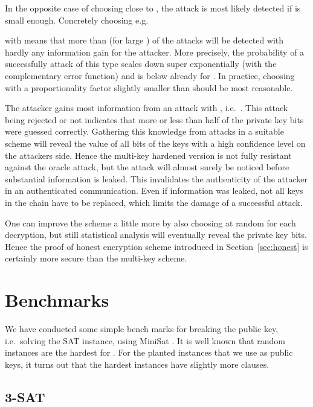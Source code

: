 \documentclass[final,journal,compsoc]{IEEEtran}
\begin{document}
In the opposite case of choosing
 close to , the attack is most likely detected if  is
small enough. Concretely choosing e.g.

with  means that more than  (for large ) of the attacks will be
detected with hardly any information gain for the attacker. More
precisely, the probability of a successfully attack of this type
scales down super exponentially (with the complementary error
function) and is below  already for . In practice,
choosing  with a proportionality factor slightly
smaller than  should be most reasonable. 

The attacker gains most information from an attack with
, i.e.\ . This
attack being rejected or not indicates that more or less than half of
the private key bits were guessed correctly. Gathering this knowledge
from  attacks in a suitable scheme will reveal the value
of all  bits of the keys with a high confidence level on the
attackers side. Hence the multi-key hardened version is not fully
resistant against the oracle attack, but the attack will almost surely
be noticed before substantial information is leaked. This invalidates
the authenticity of the attacker in an authenticated
communication. Even if information was leaked, not all keys in the
chain have to be replaced, which limits the damage of a successful
attack.  

One can improve the scheme a little more by also choosing
 at random for each decryption, but still statistical analysis
will eventually reveal the private key bits. Hence the proof of honest
encryption scheme
introduced in Section~\ref{sec:honest} is certainly more secure than
the multi-key scheme.




\section{Benchmarks\label{sec:benchmarks}}

We have conducted some simple bench marks for breaking the public key,
i.e.\ solving the SAT instance, using
MiniSat \cite{minisat}.  It is well known that
random instances are the hardest for . For the planted
instances that we use as public keys, it turns out that the hardest
instances have slightly more clauses. 



\subsection{3-SAT}
\end{document}
